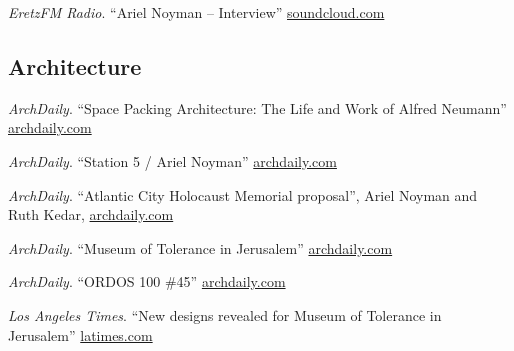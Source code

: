 \begin{tablist}
    \item[2018] \tab \textit{EretzFM Radio}. \enquote{Ariel Noyman -- Interview}
    \href{https://soundcloud.com/eretzfm/070119a-3}{soundcloud.com}

    \subsection*{Architecture}
    \item[2015] \tab \textit{ArchDaily}. \enquote{Space Packing Architecture: The Life and Work of Alfred Neumann}
    \href{https://www.archdaily.com/633053/space-packing-architecture-the-life-and-work-of-alfred-neumann}{archdaily.com}

    \item[2012] \tab \textit{ArchDaily}. \enquote{Station 5 / Ariel Noyman}
    \href{https://www.archdaily.com/117870/station-5-ariel-noyman}{archdaily.com}

    \item[2011] \tab \textit{ArchDaily}. \enquote{Atlantic City Holocaust Memorial proposal}, Ariel Noyman and Ruth Kedar,
    \href{https://www.archdaily.com/92128/atlantic-city-holocaust-memorial-proposal-ariel-noyman-and-ruth-kedar}{archdaily.com}

    \item[2010] \tab \textit{ArchDaily}. \enquote{Museum of Tolerance in Jerusalem}
    \href{https://www.archdaily.com/81319/museum-of-tolerance-in-jerusalem-chyutin-architects}{archdaily.com}

    \item[2010] \tab \textit{ArchDaily}. \enquote{ORDOS 100 \#45}
    \href{https://www.archdaily.com/32535/ordos-100-45-efrat-kowalsky-architects}{archdaily.com}

    \item[2010] \tab \textit{Los Angeles Times}. \enquote{New designs revealed for Museum of Tolerance in Jerusalem}
    \href{https://latimesblogs.latimes.com/culturemonster/2010/09/simon-wiesenthal-center-unveils-new-designs-for-museum-of-tolerance-in-jerusalem-.html}{latimes.com}

\end{tablist}

